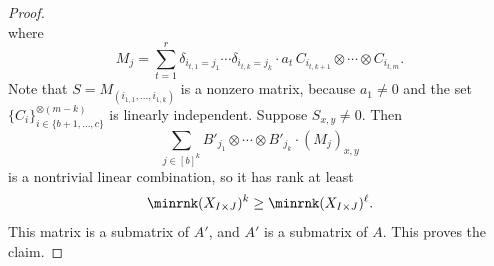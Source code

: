 \begin{proof}
\[    \]
    where
    \[
    M_j = \sum_{t=1}^r\delta_{i_{t,1}=j_1}\cdots\delta_{i_{t,k}=j_k}\cdot a_t\, C_{i_{t,k+1}}\otimes\cdots\otimes C_{i_{t,m}}.
    \]
    Note that $S = M_{(i_{1,1},\dots,i_{1,k})}$ is a nonzero matrix, because 
    $a_1\neq0$ and the set $\{C_i\}_{i\in\{b+1,\dots,c\}}^{\otimes(m-k)}$ is linearly independent. %
%
%
    Suppose $S_{x,y}\neq 0$.
    Then
    \[
    \sum_{{j}\in[b]^k}B'_{j_1}\otimes\cdots\otimes B'_{j_k} \cdot (M_j)_{x,y}
    \]
    is a nontrivial linear combination, so it has rank at least 
    \[
    \minrnk(X_{I\times J})^k\geq \minrnk(X_{I\times J})^\ell.
    \]
    This matrix is a submatrix of $A'$, and $A'$ is a submatrix of $A$. This proves the claim.
\end{proof}

